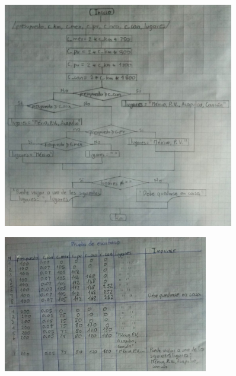 \documentclass[12pt]{article}
\begin{document}
\begin{enumerate}
                \begin{figure}[!h]
                    \centering
                    \includegraphics[width=0.9\textwidth]{Img/DF_ej7_1.jpeg}
                \end{figure}

                \newpage
                \begin{figure}[!h]
                    \centering
                    \includegraphics[width=0.8\textwidth]{Img/DF_ej7_2.jpeg}
                \end{figure}


\end{enumerate}
\end{document}
